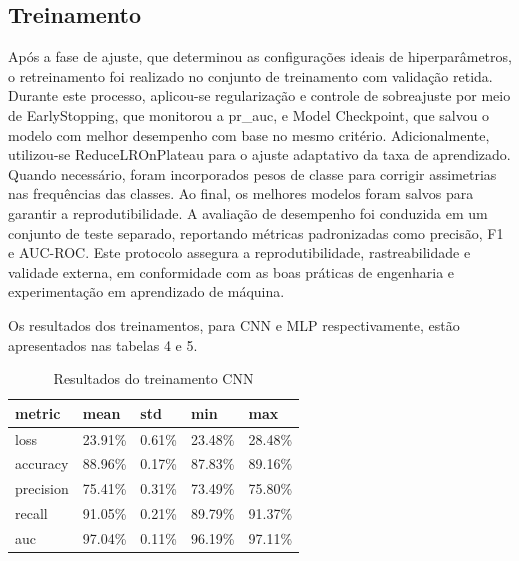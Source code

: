 \subsection{Treinamento}
Após a fase de ajuste, que determinou as configurações ideais de hiperparâmetros, o retreinamento foi realizado no conjunto de treinamento com validação retida. Durante este processo, aplicou-se regularização e controle de sobreajuste por meio de EarlyStopping, que monitorou a pr\_auc, e Model Checkpoint, que salvou o modelo com melhor desempenho com base no mesmo critério. Adicionalmente, utilizou-se ReduceLROnPlateau para o ajuste adaptativo da taxa de aprendizado. Quando necessário, foram incorporados pesos de classe para corrigir assimetrias nas frequências das classes. Ao final, os melhores modelos foram salvos para garantir a reprodutibilidade. A avaliação de desempenho foi conduzida em um conjunto de teste separado, reportando métricas padronizadas como precisão, F1 e AUC-ROC. Este protocolo assegura a reprodutibilidade, rastreabilidade e validade externa, em conformidade com as boas práticas de engenharia e experimentação em aprendizado de máquina. 

Os resultados dos treinamentos, para CNN e MLP respectivamente, estão apresentados nas tabelas 4 e 5. 

\begin{table}[H]
    \centering
    \caption{Resultados do treinamento CNN}
    \label{tab:train_cnn}
    \begin{tabular}{@{}lllll@{}}
        \toprule
        \textbf{metric} & \textbf{mean} & \textbf{std} & \textbf{min} & \textbf{max} \\
        \midrule
        loss & 23.91\% & 0.61\% & 23.48\% & 28.48\% \\
        accuracy & 88.96\% & 0.17\% & 87.83\% & 89.16\% \\
        precision & 75.41\% & 0.31\% & 73.49\% & 75.80\% \\
        recall & 91.05\% & 0.21\% & 89.79\% & 91.37\% \\
        auc & 97.04\% & 0.11\% & 96.19\% & 97.11\% \\
        \bottomrule
    \end{tabular}
\end{table}

